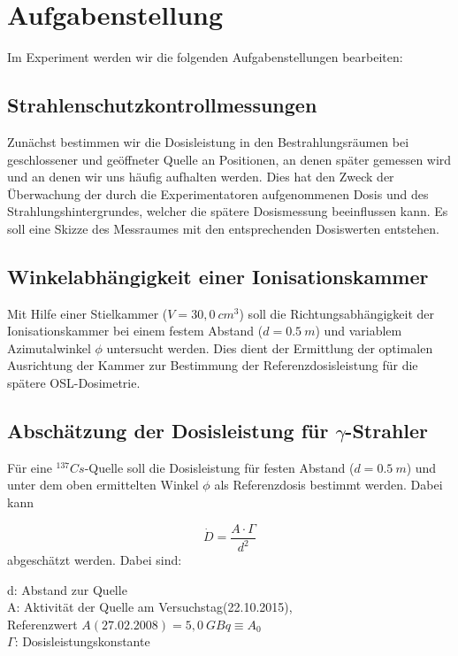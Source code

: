 \section{Aufgabenstellung}
Im Experiment werden wir die folgenden Aufgabenstellungen bearbeiten:
\subsection{Strahlenschutzkontrollmessungen}
Zunächst bestimmen wir die Dosisleistung in den Bestrahlungsräumen bei geschlossener und geöffneter Quelle an Positionen, an denen später gemessen wird und an denen wir uns häufig aufhalten werden. Dies hat den Zweck der Überwachung der durch die Experimentatoren aufgenommenen Dosis und des Strahlungshintergrundes, welcher die spätere Dosismessung beeinflussen kann. Es soll eine Skizze des Messraumes mit den entsprechenden Dosiswerten entstehen.

\subsection{Winkelabhängigkeit einer Ionisationskammer}
Mit Hilfe einer Stielkammer ($V = 30,0\ cm^3$) soll die Richtungsabhängigkeit der Ionisationskammer bei einem festem Abstand ($d=0.5\ m$) und variablem Azimutalwinkel $\phi$ untersucht werden.
Dies dient der Ermittlung der optimalen Ausrichtung der Kammer zur Bestimmung der Referenzdosisleistung für die spätere OSL-Dosimetrie.

\subsection{Abschätzung der Dosisleistung für $\gamma$-Strahler}
Für eine $^{137}Cs$-Quelle soll die Dosisleistung für festen Abstand ($d=0.5\ m$) und unter dem oben ermittelten Winkel $\phi$ als Referenzdosis bestimmt werden. Dabei kann

\begin{equation} \label{eq:dosisleistung}
	\dot{D}=\frac{A \cdot \Gamma}{d^2}
\end{equation}
abgeschätzt werden. Dabei sind:
\begin{center}
	\begin{minipage}{.9\textwidth}
		d: Abstand zur Quelle\\
		A: Aktivität der Quelle am Versuchstag(22.10.2015), \\
		Referenzwert $A(27.02.2008) = 5,0\ GBq \equiv A_0$\\
		$\Gamma$: Dosisleistungskonstante
	
	\end{minipage}
\end{center}

